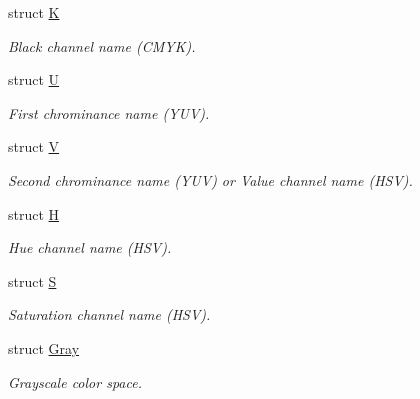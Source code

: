 \begin{DoxyCompactItemize}
struct \hyperlink{struct_d_o_1_1_k}{K}
\begin{DoxyCompactList}\small\item\em Black channel name (C\-M\-Y\-K). \end{DoxyCompactList}\item 
struct \hyperlink{struct_d_o_1_1_u}{U}
\begin{DoxyCompactList}\small\item\em First chrominance name (Y\-U\-V). \end{DoxyCompactList}\item 
struct \hyperlink{struct_d_o_1_1_v}{V}
\begin{DoxyCompactList}\small\item\em Second chrominance name (Y\-U\-V) or Value channel name (H\-S\-V). \end{DoxyCompactList}\item 
struct \hyperlink{struct_d_o_1_1_h}{H}
\begin{DoxyCompactList}\small\item\em Hue channel name (H\-S\-V). \end{DoxyCompactList}\item 
struct \hyperlink{struct_d_o_1_1_s}{S}
\begin{DoxyCompactList}\small\item\em Saturation channel name (H\-S\-V). \end{DoxyCompactList}\item 
struct \hyperlink{struct_d_o_1_1_gray}{Gray}
\begin{DoxyCompactList}\small\item\em Grayscale color space. \end{DoxyCompactList}\end{DoxyCompactItemize}
